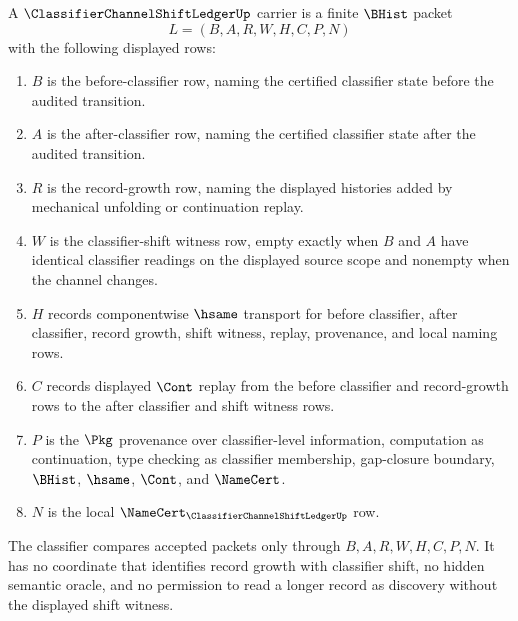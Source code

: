 \begin{definition}\label{def:classifier-channel-shift-ledger-carrier}
A $\ClassifierChannelShiftLedgerUp$ carrier is a finite $\BHist$ packet
$$
L=(B,A,R,W,H,C,P,N)
$$
with the following displayed rows:
\begin{enumerate}
\item $B$ is the before-classifier row, naming the certified classifier state before the audited transition.
\item $A$ is the after-classifier row, naming the certified classifier state after the audited transition.
\item $R$ is the record-growth row, naming the displayed histories added by mechanical unfolding or continuation replay.
\item $W$ is the classifier-shift witness row, empty exactly when $B$ and $A$ have identical classifier readings on the displayed source scope and nonempty when the channel changes.
\item $H$ records componentwise $\hsame$ transport for before classifier, after classifier, record growth, shift witness, replay, provenance, and local naming rows.
\item $C$ records displayed $\Cont$ replay from the before classifier and record-growth rows to the after classifier and shift witness rows.
\item $P$ is the $\Pkg$ provenance over classifier-level information, computation as continuation, type checking as classifier membership, gap-closure boundary, $\BHist$, $\hsame$, $\Cont$, and $\NameCert$.
\item $N$ is the local $\NameCert_{\ClassifierChannelShiftLedgerUp}$ row.
\end{enumerate}
The classifier compares accepted packets only through $B,A,R,W,H,C,P,N$. It has no coordinate that identifies record growth with classifier shift, no hidden semantic oracle, and no permission to read a longer record as discovery without the displayed shift witness.
\end{definition}

